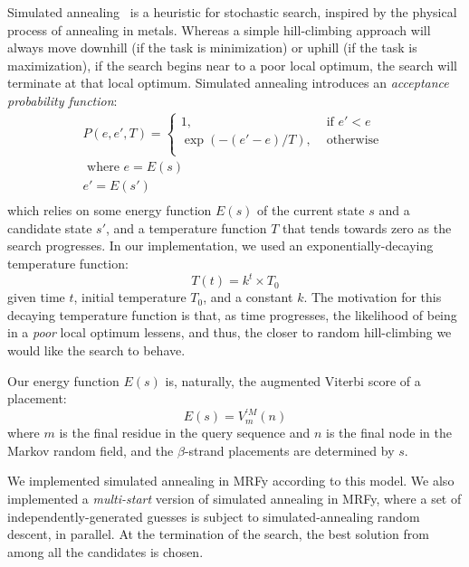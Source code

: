 \documentclass{acm_proc_article-sp}
\begin{document}
Simulated annealing~\cite{Kirkpatrick:1983wa} is a heuristic for stochastic search,
inspired by the physical process of annealing in metals.
Whereas a simple hill-climbing approach will always move downhill (if the task
is minimization) or uphill (if the task is maximization), if the search begins
near to a poor local optimum, the search will terminate at that local optimum.
Simulated annealing introduces an \emph{acceptance probability function}:
\begin{equation}
  \begin{split}
  P(e,e',T) = \begin{cases}
    1, & \text{ if } e' < e\\
    \exp(-(e'-e)/T),& \text{ otherwise }\\
\end{cases}\\
  \text{ where }
     e = E(s) \\
     e' = E(s')\\
  \end{split}
\end{equation}
which relies on some energy function $E(s)$ of the current state $s$ and
a candidate state $s'$, and a temperature function $T$ that tends towards zero
as the search progresses.
In our implementation, we used an exponentially-decaying temperature function:
\begin{equation}
  T(t) = k^{t}\times T_{0}
\end{equation}
given time $t$, initial temperature $T_{0}$, and a constant $k$.
The motivation for this decaying temperature function is that, as time 
progresses, the likelihood of being in a \emph{poor} local optimum lessens, and
thus, the closer to random hill-climbing we would like the search to behave.


Our energy function $E(s)$ is, naturally, the augmented Viterbi score of a
placement:
\begin{equation}
  E(s) = V_{m}^{\prime M}(n)
\end{equation}
where $m$ is the final residue in the query sequence and $n$ is the final
node in the Markov random field, and the $\beta$-strand placements are 
determined by $s$.

We implemented simulated annealing in MRFy according to this model.
We also implemented a \emph{multi-start} version of simulated annealing in MRFy,
where a set of independently-generated guesses is subject to simulated-annealing
random descent, in parallel.
At the termination of the search, the best solution from among all the 
candidates is chosen.
\end{document}
